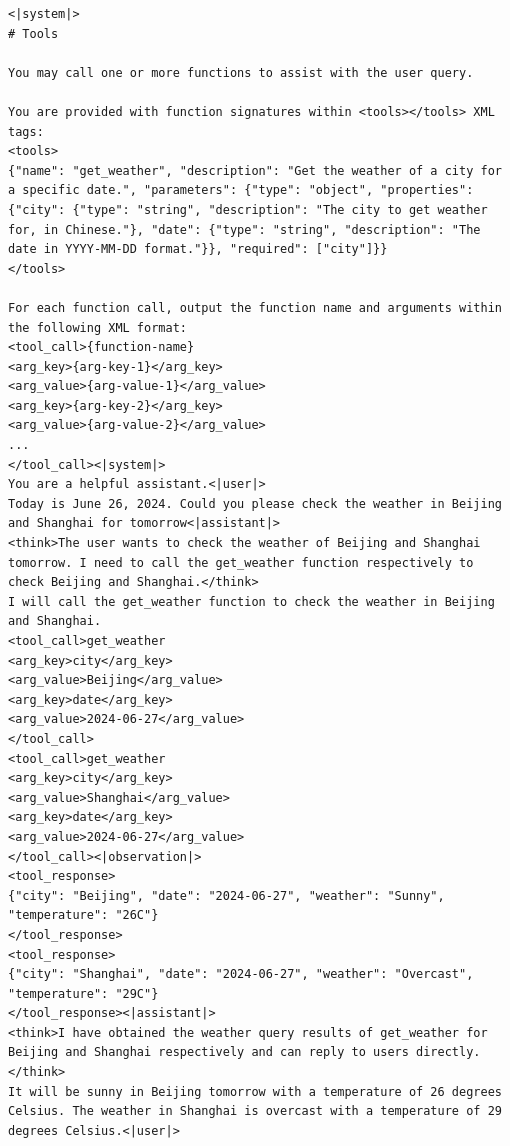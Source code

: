 \begin{tcolorbox}[left=0mm,right=0mm,top=0mm,bottom=0mm,boxsep=1mm,arc=0mm,boxrule=0pt, frame empty, breakable]
\scriptsize
\begin{lstlisting}
<|system|>
# Tools

You may call one or more functions to assist with the user query.

You are provided with function signatures within <tools></tools> XML tags:
<tools>
{"name": "get_weather", "description": "Get the weather of a city for a specific date.", "parameters": {"type": "object", "properties": {"city": {"type": "string", "description": "The city to get weather for, in Chinese."}, "date": {"type": "string", "description": "The date in YYYY-MM-DD format."}}, "required": ["city"]}}
</tools>

For each function call, output the function name and arguments within the following XML format:
<tool_call>{function-name}
<arg_key>{arg-key-1}</arg_key>
<arg_value>{arg-value-1}</arg_value>
<arg_key>{arg-key-2}</arg_key>
<arg_value>{arg-value-2}</arg_value>
...
</tool_call><|system|>
You are a helpful assistant.<|user|>
Today is June 26, 2024. Could you please check the weather in Beijing and Shanghai for tomorrow<|assistant|>
<think>The user wants to check the weather of Beijing and Shanghai tomorrow. I need to call the get_weather function respectively to check Beijing and Shanghai.</think>
I will call the get_weather function to check the weather in Beijing and Shanghai.
<tool_call>get_weather
<arg_key>city</arg_key>
<arg_value>Beijing</arg_value>
<arg_key>date</arg_key>
<arg_value>2024-06-27</arg_value>
</tool_call>
<tool_call>get_weather
<arg_key>city</arg_key>
<arg_value>Shanghai</arg_value>
<arg_key>date</arg_key>
<arg_value>2024-06-27</arg_value>
</tool_call><|observation|>
<tool_response>
{"city": "Beijing", "date": "2024-06-27", "weather": "Sunny", "temperature": "26C"}
</tool_response>
<tool_response>
{"city": "Shanghai", "date": "2024-06-27", "weather": "Overcast", "temperature": "29C"}
</tool_response><|assistant|>
<think>I have obtained the weather query results of get_weather for Beijing and Shanghai respectively and can reply to users directly.</think>
It will be sunny in Beijing tomorrow with a temperature of 26 degrees Celsius. The weather in Shanghai is overcast with a temperature of 29 degrees Celsius.<|user|>
\end{lstlisting}
\end{tcolorbox}
\noindent\begin{minipage}{\textwidth}
\label{fig:fc-template}
\end{minipage}


